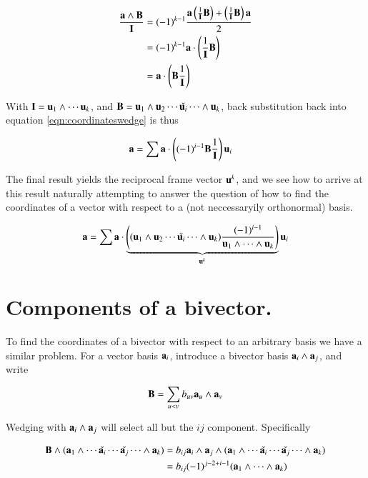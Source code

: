 \documentclass{article}      %
\begin{document}
\begin{align*}
\frac{\mathbf{a} \wedge \mathbf{B}}{\mathbf{I}}
&= (-1)^{k-1} \frac{\mathbf{a} \left(\frac{1}{\mathbf{I}}\mathbf{B}\right) + \left(\frac{1}{\mathbf{I}}\mathbf{B}\right)\mathbf{a}}{2} \\
&= (-1)^{k-1} \mathbf{a} \cdot \left(\frac{1}{\mathbf{I}}\mathbf{B}\right) \\
&= \mathbf{a} \cdot \left(\mathbf{B} \frac{1}{\mathbf{I}}\right) \\
\end{align*}

With $\mathbf{I} = \mathbf{u}_1 \wedge \cdots \mathbf{u}_k$, and $\mathbf{B} = \mathbf{u}_1 \wedge \mathbf{u}_2 \cdots \check{\mathbf{u}_i} \cdots \wedge \mathbf{u}_k$,
back substitution back into equation \ref{eqn:coordinateswedge} is thus

\begin{align*}
\mathbf{a} 
&= \sum
\mathbf{a} \cdot \left(
(-1)^{i-1} 
\mathbf{B} \frac{1}{\mathbf{I}}\right) \mathbf{u}_i
\end{align*}

The final result yields the reciprocal frame vector $\mathbf{u}^k$, and we see how to arrive at this result naturally attempting
to answer the question of how to find the coordinates of a vector with respect to a (not neccessaryily orthonormal) basis.

\begin{equation}\label{eqn:recipdot}
\mathbf{a} =
\sum
\mathbf{a} \cdot 
\underbrace{
\left((\mathbf{u}_1 \wedge \mathbf{u}_2 \cdots \check{\mathbf{u}_i} \cdots \wedge \mathbf{u}_k) \frac{ (-1)^{i-1} }{ \mathbf{u}_1 \wedge \cdots \wedge \mathbf{u}_k }\right) 
}_{\mathbf{u}^k}
\mathbf{u}_i
\end{equation}

\section{ Components of a bivector. }

To find the coordinates of a bivector with respect to an arbitrary basis we have a similar problem.
For a vector basis ${\mathbf{a}_i}$, introduce a bivector basis ${\mathbf{a}_i \wedge \mathbf{a}_j}$, and write

\begin{equation}\label{eqn:bivectorcoord}
\mathbf{B} = \sum_{u<v} b_{uv} \mathbf{a}_u \wedge \mathbf{a}_v
\end{equation}

Wedging with $\mathbf{a}_i \wedge \mathbf{a}_j$ will select all but the $ij$ component.  Specifically

\begin{align*}
\mathbf{B} \wedge 
(\mathbf{a}_1 \wedge \cdots \check{\mathbf{a}_i} \cdots \check{\mathbf{a}_j} \cdots \wedge \mathbf{a}_k) 
&= b_{ij} \mathbf{a}_i \wedge \mathbf{a}_j \wedge (\mathbf{a}_1 \wedge \cdots \check{\mathbf{a}_i} \cdots \check{\mathbf{a}_j} \cdots \wedge \mathbf{a}_k)  \\
&= b_{ij} (-1)^{j-2 + i-1}(\mathbf{a}_1 \wedge \cdots \wedge \mathbf{a}_k) \\
\end{align*}
\end{document}
